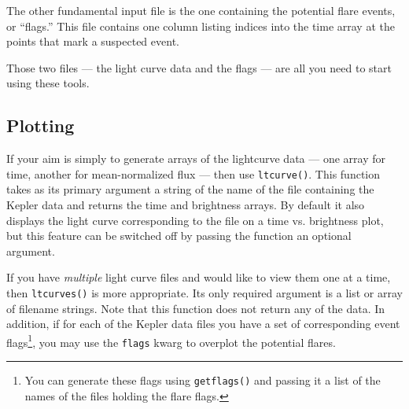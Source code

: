 \documentclass[11pt]{article}
\begin{document}
The other fundamental input file is the one containing the potential
flare events, or ``flags.''  This file contains one column listing
indices into the time array at the points that mark a suspected event.


Those two files --- the light curve data and the flags --- are all you
need to start using these tools.


\subsection{Plotting}
\label{sec:basic}

If your aim is simply to generate arrays of the lightcurve data ---
one array for time, another for mean-normalized flux --- then use
\verb|ltcurve()|.  This function takes as its primary argument a
string of the name of the file containing the Kepler data and returns
the time and brightness arrays.  By default it also displays the light
curve corresponding to the file on a time vs. brightness plot, but
this feature can be switched off by passing the function an optional
argument.

If you have \emph{multiple} light curve files and would like to view
them one at a time, then \verb|ltcurves()| is more appropriate.  Its
only required argument is a list or array of filename strings.  Note
that this function does not return any of the data.  In addition, if
for each of the Kepler data files you have a set of corresponding
event flags\footnote{You can generate these flags using
  \texttt{getflags()} and passing it a list of the names of the files
  holding the flare flags.}, you may use the \verb|flags| kwarg to
overplot the potential flares.
\end{document}

